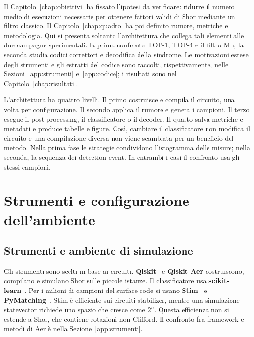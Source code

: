 \begin{onehalfspace}

Il Capitolo~\ref{chap:obiettivi} ha fissato l'ipotesi da verificare: ridurre il numero
medio di esecuzioni necessarie per ottenere fattori validi di Shor mediante un filtro
classico. Il Capitolo~\ref{chap:quadro} ha poi definito rumore, metriche e metodologia.
Qui si presenta soltanto l'architettura che collega tali elementi alle due campagne
sperimentali: la prima confronta TOP-1, TOP-4 e il filtro \ac{ML}; la seconda studia
codici correttori e decodifica della sindrome. Le motivazioni estese degli strumenti e
gli estratti del codice sono raccolti, rispettivamente, nelle
Sezioni~\ref{app:strumenti} e~\ref{app:codice}; i risultati sono nel
Capitolo~\ref{chap:risultati}.

L'architettura ha quattro livelli. Il primo costruisce e compila il circuito, una volta per configurazione. Il secondo applica il rumore e genera i campioni. Il terzo esegue il post-processing, il classificatore o il decoder. Il quarto salva metriche e metadati e produce tabelle e figure. Così, cambiare il classificatore non modifica il circuito e una compilazione diversa non viene scambiata per un beneficio del metodo. Nella prima fase le strategie condividono l'istogramma delle misure; nella seconda, la sequenza dei detection event. In entrambi i casi il confronto usa gli stessi campioni.

\section{Strumenti e configurazione dell'ambiente}
\label{chap:strumenti}

\subsection{Strumenti e ambiente di simulazione}
\label{sec:strumenti_ambiente}

Gli strumenti sono scelti in base ai circuiti. \textbf{Qiskit}~\cite{qiskit2023} e \textbf{Qiskit Aer} costruiscono, compilano e simulano Shor sulle piccole istanze. Il classificatore usa \textbf{scikit-learn}~\cite{scikit_learn}. Per i milioni di campioni del surface code si usano \textbf{Stim}~\cite{stim2021} e \textbf{PyMatching}~\cite{pymatching2021}. Stim è efficiente sui circuiti stabilizer, mentre una simulazione statevector richiede uno spazio che cresce come $2^n$. Questa efficienza non si estende a Shor, che contiene rotazioni non-Clifford. Il confronto fra framework e metodi di Aer è nella Sezione~\ref{app:strumenti}.


\end{onehalfspace}

